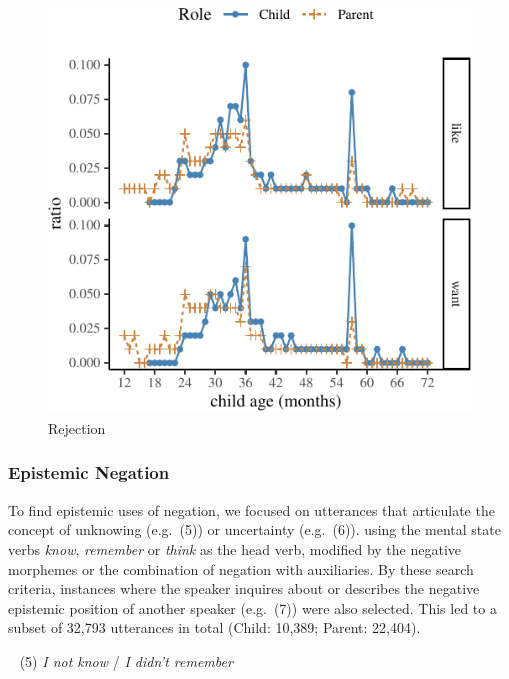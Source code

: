 \documentclass[10pt, letterpaper]{article}
\newenvironment{CodeChunk}{}{}
\begin{document}
\begin{CodeChunk}
\begin{figure}[H]

{\centering \includegraphics{figs/emotion-1} 

}

\caption[Rejection]{Rejection}\label{fig:emotion}
\end{figure}
\end{CodeChunk}

\hypertarget{epistemic-negation}{%
\subsubsection{Epistemic Negation}\label{epistemic-negation}}

To find epistemic uses of negation, we focused on utterances that
articulate the concept of unknowing (e.g.~(5)) or uncertainty
(e.g.~(6)). using the mental state verbs \emph{know}, \emph{remember} or
\emph{think} as the head verb, modified by the negative morphemes or the
combination of negation with auxiliaries. By these search criteria,
instances where the speaker inquires about or describes the negative
epistemic position of another speaker (e.g.~(7)) were also selected.
This led to a subset of 32,793 utterances in total (Child: 10,389;
Parent: 22,404).

~ (5) \emph{I not know} / \emph{I didn't remember}
\end{document}
